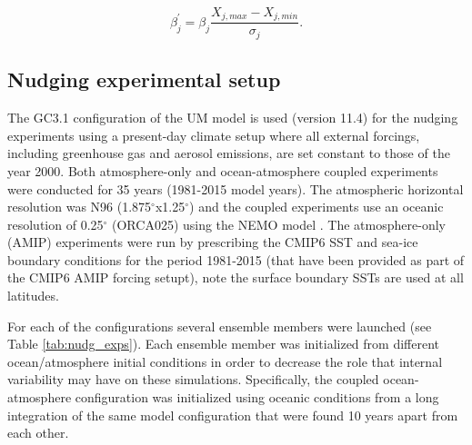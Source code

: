\begin{equation}
\beta_j^\prime=\beta_j\frac{X_{j,max}-X_{j,min}}{\sigma_j}.
\end{equation}


\subsection{Nudging experimental setup}\label{nudg_setup}

The GC3.1 configuration of the UM model is used (version 11.4) for the nudging experiments using a present-day climate setup where all external forcings, including greenhouse gas and aerosol emissions, are set constant to those of the year 2000.
Both atmosphere-only and ocean-atmosphere coupled experiments were conducted for 35 years (1981-2015 model years). The atmospheric horizontal resolution was N96 (1.875$^\circ$x1.25$^\circ$) and the coupled experiments use an oceanic resolution of 0.25$^\circ$ (ORCA025) using the NEMO model \citep{storkey2018}. %
 The atmosphere-only (AMIP) experiments were run by prescribing the CMIP6 SST and sea-ice boundary conditions for the period 1981-2015 (that have been provided as part of the CMIP6 AMIP forcing setupt), note the surface boundary SSTs are used at all latitudes. 
 
 For each of the configurations several ensemble members were launched (see Table \ref{tab:nudg_exps}).
Each ensemble member was initialized from different ocean/atmosphere initial conditions in order to decrease the role that internal variability may have on these simulations. Specifically, the coupled ocean-atmosphere configuration was initialized using oceanic conditions from a long integration of the same model configuration that were found 10 years apart from each other. %
 
%
%

